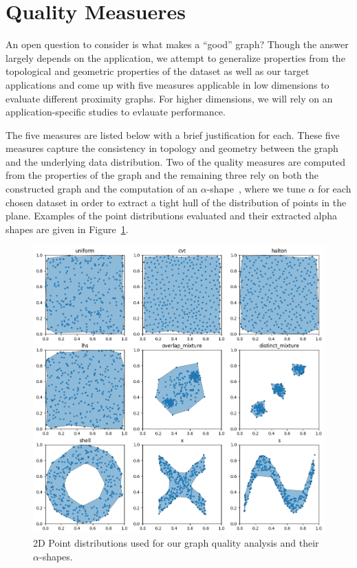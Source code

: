 \section{Quality Measueres}
\label{sec:graph_quality_measures}
An open question to consider is what makes a ``good'' graph?
%
Though the answer largely depends on the application, we attempt to generalize properties from the topological and geometric properties of the dataset as well as our target applications and come up with five measures applicable in low dimensions to evaluate different proximity graphs.
%
For higher dimensions, we will rely on an application-specific studies to evlauate performance.

The five measures are listed below with a brief justification for each.
%
These five measures capture the consistency in topology and geometry between the graph and the underlying data distribution.
%
Two of the quality measures are computed from the properties of the graph and the remaining three rely on both the constructed graph and the computation of an $\alpha$-shape~\cite{EdelsbrunnerKirkpatrickSeidel1983}, where we tune $\alpha$ for each chosen dataset in order to extract a tight hull of the distribution of points in the plane.
%
Examples of the point distributions evaluated and their extracted alpha shapes are given in Figure~\ref{fig:shapes}.

\begin{figure}[htbp]
    \includegraphics[width=\linewidth]{figs/chap7/sample_shapes.png}
    \caption{2D Point distributions used for our graph quality analysis and their $\alpha$-shapes.}
    \label{fig:shapes}
\end{figure}

